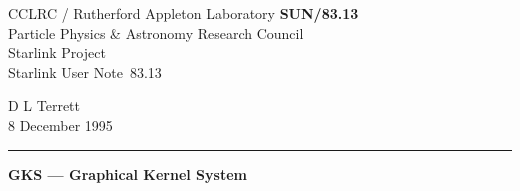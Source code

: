 \documentclass[11pt]{article}
\newcommand{\stardoccategory}  {Starlink User Note}
\newcommand{\stardocinitials}  {SUN}
\newcommand{\stardocnumber}    {83.13}
\newcommand{\stardocauthors}   {D L Terrett}
\newcommand{\stardocdate}      {8 December 1995}
\newcommand{\stardoctitle}     {GKS --- Graphical Kernel System}
\newcommand{\stardocversion}   {1.37}
\newcommand{\stardocmanual}    {User's Manual}
\newcommand{\stardocname}{\stardocinitials /\stardocnumber}
\newenvironment{latexonly}{}{}
\begin{document}
\thispagestyle{empty}

\begin{latexonly}
   CCLRC / {\sc Rutherford Appleton Laboratory} \hfill {\bf \stardocname}\\
   {\large Particle Physics \& Astronomy Research Council}\\
   {\large Starlink Project\\}
   {\large \stardoccategory\ \stardocnumber}
   \begin{flushright}
   \stardocauthors\\
   \stardocdate
   \end{flushright}
   \vspace{-4mm}
   \rule{\textwidth}{0.5mm}
   \vspace{5mm}
   \begin{center}
   {\Huge\bf  \stardoctitle \\ [2.5ex]}
   \end{center}
   \vspace{5mm}

\end{latexonly}
\end{document}
